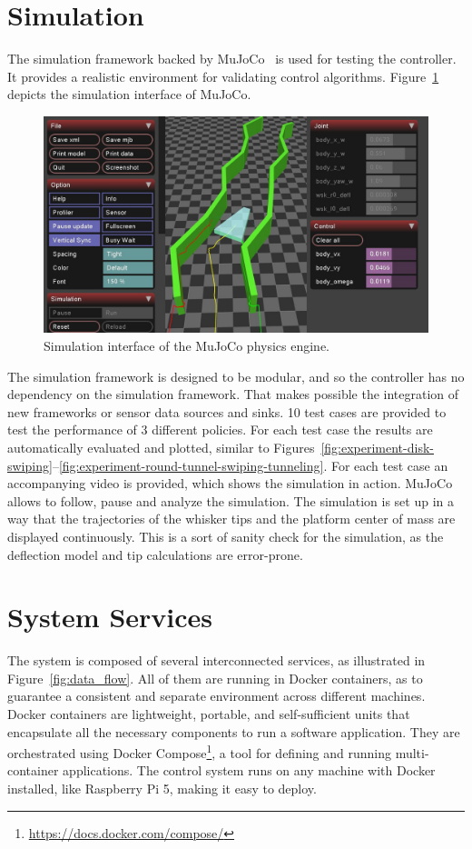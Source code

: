 \section{Simulation}
The simulation framework backed by MuJoCo~\cite{todorov2012mujoco} is used for testing the controller.
It provides a realistic environment for validating control algorithms.
Figure~\ref{fig:mujoco} depicts the simulation interface of MuJoCo.

\begin{figure}
    \centering
    \includegraphics[width=\textwidth]{figures/mujoco}
    \caption{Simulation interface of the MuJoCo physics engine.}
    \label{fig:mujoco}
\end{figure}

The simulation framework is designed to be modular, and so the controller has no dependency on the simulation framework.
That makes possible the integration of new frameworks or sensor data sources and sinks.
10 test cases are provided to test the performance of 3 different policies.
For each test case the results are automatically evaluated and plotted, similar to Figures~\ref{fig:experiment-disk-swiping}--\ref{fig:experiment-round-tunnel-swiping-tunneling}.
For each test case an accompanying video is provided, which shows the simulation in action.
MuJoCo allows to follow, pause and analyze the simulation.
The simulation is set up in a way that the trajectories of the whisker tips and the platform center of mass are displayed continuously.
This is a sort of sanity check for the simulation, as the deflection model and tip calculations are error-prone.


\section{System Services}
The system is composed of several interconnected services, as illustrated in Figure~\ref{fig:data_flow}.
All of them are running in Docker containers, as to guarantee a consistent and separate environment across different machines.
Docker containers are lightweight, portable, and self-sufficient units that encapsulate all the necessary components to run a software application.
They are orchestrated using Docker Compose\footnote{\url{https://docs.docker.com/compose/}}, a tool for defining and running multi-container applications.
The control system runs on any machine with Docker installed, like Raspberry Pi 5, making it easy to deploy.

